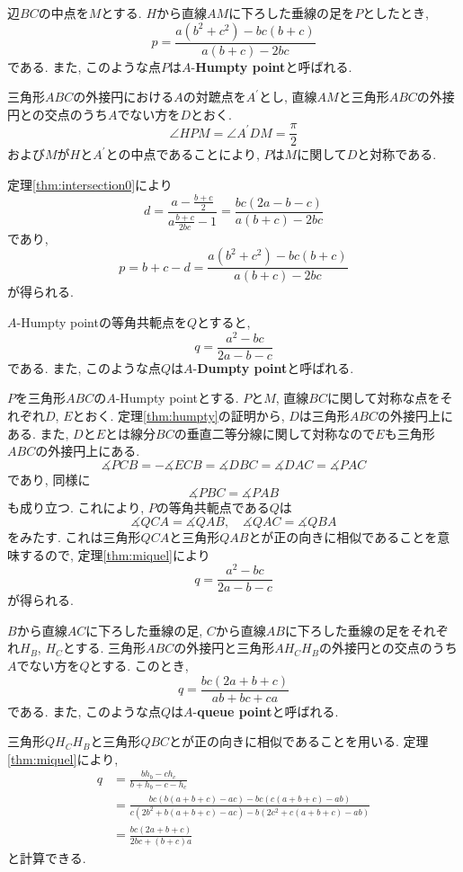 %
%
\begin{bthm}\label{thm:humpty}
辺$BC$の中点を$M$とする.
$H$から直線$AM$に下ろした垂線の足を$P$としたとき,
\[p=\frac{a(b^2+c^2)-bc(b+c)}{a(b+c)-2bc}\]
である.
また, このような点$P$は$A$-\textbf{Humpty point}と呼ばれる.
\end{bthm}
\begin{prf*}
三角形$ABC$の外接円における$A$の対蹠点を$A^\prime$とし, 直線$AM$と三角形$ABC$の外接円との交点のうち$A$でない方を$D$とおく.
\[\angle HPM=\angle A^\prime DM=\frac\pi 2\]
および$M$が$H$と$A^\prime$との中点であることにより, $P$は$M$に関して$D$と対称である.

定理\ref{thm:intersection0}により
\[d=\frac{a-\frac{b+c}2}{a\frac{b+c}{2bc}-1}=\frac{bc(2a-b-c)}{a(b+c)-2bc}\]
であり,
\[p=b+c-d=\frac{a(b^2+c^2)-bc(b+c)}{a(b+c)-2bc}\]
が得られる.
\end{prf*}
%
%
\begin{bthm}
$A$-Humpty pointの等角共軛点を$Q$とすると,
\[q=\frac{a^2-bc}{2a-b-c}\]
である.
また, このような点$Q$は$A$-\textbf{Dumpty point}と呼ばれる.
\end{bthm}
\begin{prf*}
$P$を三角形$ABC$の$A$-Humpty pointとする.
$P$と$M$, 直線$BC$に関して対称な点をそれぞれ$D$, $E$とおく.
定理\ref{thm:humpty}の証明から, $D$は三角形$ABC$の外接円上にある.
また, $D$と$E$とは線分$BC$の垂直二等分線に関して対称なので$E$も三角形$ABC$の外接円上にある.
\[\measuredangle PCB=-\measuredangle ECB=\measuredangle DBC=\measuredangle DAC=\measuredangle PAC\]
であり, 同様に
\[\measuredangle PBC=\measuredangle PAB\]
も成り立つ.
これにより, $P$の等角共軛点である$Q$は
\[\measuredangle QCA=\measuredangle QAB,\quad\measuredangle QAC=\measuredangle QBA\]
をみたす.
これは三角形$QCA$と三角形$QAB$とが正の向きに相似であることを意味するので, 定理\ref{thm:miquel}により
\[q=\frac{a^2-bc}{2a-b-c}\]
が得られる.
\end{prf*}
%
%
\begin{bthm}
$B$から直線$AC$に下ろした垂線の足, $C$から直線$AB$に下ろした垂線の足をそれぞれ$H_B$, $H_C$とする.
三角形$ABC$の外接円と三角形$AH_CH_B$の外接円との交点のうち$A$でない方を$Q$とする.
このとき,
\[q=\frac{bc(2a+b+c)}{ab+bc+ca}\]
である.
また, このような点$Q$は$A$-\textbf{queue point}と呼ばれる.
\end{bthm}
\begin{prf*}
三角形$QH_CH_B$と三角形$QBC$とが正の向きに相似であることを用いる.
定理\ref{thm:miquel}により,
\begin{align*}
q
&=\frac{bh_b-ch_c}{b+h_b-c-h_c}\\
&=\frac{bc(b(a+b+c)-ac)-bc(c(a+b+c)-ab)}{c(2b^2+b(a+b+c)-ac)-b(2c^2+c(a+b+c)-ab)}\\
&=\frac{bc(2a+b+c)}{2bc+(b+c)a}
\end{align*}
と計算できる.
\end{prf*}
%
%
